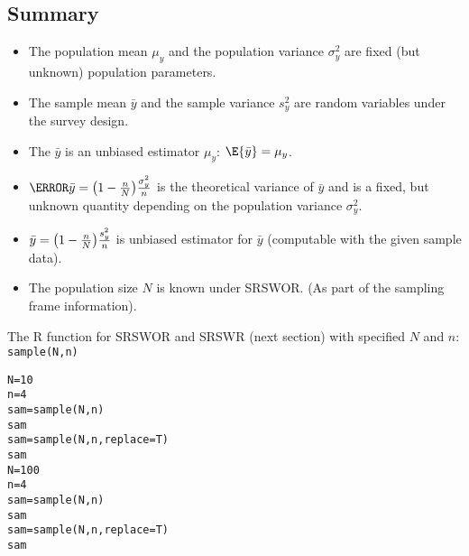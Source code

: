 \subsection*{Summary}
\begin{Regular}{}
    \begin{itemize}
        \item The population mean $ \mu_y $ and the population variance
              $ \sigma_y^2 $ are fixed (but unknown) population parameters.
        \item The sample mean $ \bar{y} $ and the sample variance $ s_y^2 $
              are random variables under the survey design.
        \item The $ \bar{y} $ is an unbiased estimator $ \mu_y $: $ \E{\bar{y}}=\mu_y $.
        \item $ \V{\bar{y}}=\bigl(1-\frac{n}{N}\bigr)\frac{\sigma_y^2}{n} $
              is the theoretical variance of $ \bar{y} $ and is a fixed, but unknown
              quantity depending on the population variance $ \sigma_y^2 $.
        \item $ \relax{\bar{y}}=\bigl(1-\frac{n}{N}\bigr)\frac{s_y^2}{n} $
              is unbiased estimator for $ \bar{y} $ (computable with the given sample data).
        \item The population size $ N $ is known under SRSWOR\@. (As part of the sampling
              frame information).
    \end{itemize}
\end{Regular}
\begin{Example}{}
    The R function for SRSWOR and SRSWR (next section) with
    specified $N$ and $n$: \texttt{sample(N,n)}
    \begin{verbatim}
N=10
n=4
sam=sample(N,n)
sam
sam=sample(N,n,replace=T)
sam
N=100
n=4
sam=sample(N,n)
sam
sam=sample(N,n,replace=T)
sam
\end{verbatim}
\end{Example}
